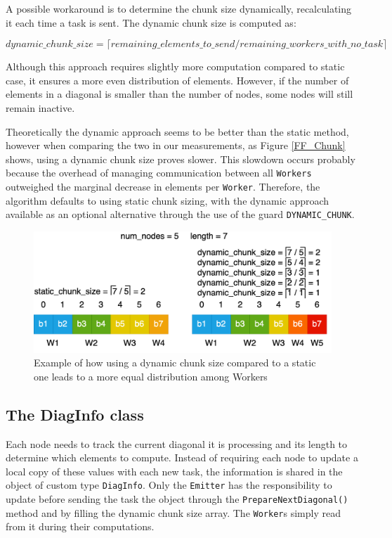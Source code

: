 A possible workaround is to determine the chunk size dynamically, recalculating it each time a task is sent. The dynamic chunk size is computed as:

\[
    dynamic\_chunk\_size = \lceil {remaining\_elements\_to\_send / remaining\_workers\_with\_no\_task}\rceil
\]

Although this approach requires slightly more computation compared to static case, it ensures a more even distribution of elements. However, if the number of elements in a diagonal is smaller than the number of nodes, some nodes will still remain inactive.

Theoretically the dynamic approach seems to be better than the static method, however when comparing the two in our measurements, as Figure \ref{FF_Chunk} shows, using a dynamic chunk size proves slower. This slowdown occurs probably because the overhead of managing communication between all \texttt{Workers} outweighed the marginal decrease in elements per \texttt{Worker}. Therefore, the algorithm defaults to using static chunk sizing, with the dynamic approach available as an optional alternative through the use of the guard \texttt{DYNAMIC\_CHUNK}.

\begin{figure}[h]
    \centering\includegraphics[scale=0.25]{img/FastFlow/Static_vs_Dynamic.drawio.png}
    
    \caption{Example of how using a dynamic chunk size compared to a static one leads to a more equal distribution among Workers}
\end{figure}

\subsection*{The DiagInfo class}
Each node needs to track the current diagonal it is processing and its length to determine which elements to compute. Instead of requiring each node to update a local copy of these values with each new task, the information is shared in the object of custom type \texttt{DiagInfo}. Only the \texttt{Emitter} has the responsibility to update before sending the task the object through the \texttt{PrepareNextDiagonal()} method and by filling the dynamic chunk size array. The \texttt{Worker}s simply read from it during their computations.

